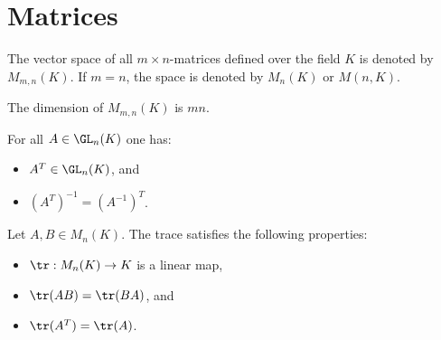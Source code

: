 \section{Matrices}

    \begin{notation}\label{linalgebra:matrix_set}
        The vector space of all $m\times n$-matrices defined over the field $K$ is denoted by $M_{m,n}(K)$. If $m=n$, the space is denoted by $M_n(K)$ or $M(n,K)$.
    \end{notation}

    \begin{property}[Dimension]\label{linalgebra:dimension_of_matrix_space}
        The dimension of $M_{m,n}(K)$ is $mn$.
    \end{property}

    \begin{property}
        For all $A\in\GL_n(K)$ one has:
        \begin{itemize}
            \item $A^T\in\GL_n(K)$, and
            \item $\left(A^T\right)^{-1}=\left(A^{-1}\right)^T$.
        \end{itemize}
    \end{property}

    \begin{property}\label{linalgebra:trace_commutative}
        Let $A,B\in M_n(K)$. The trace satisfies the following properties:
        \begin{itemize}
            \item $\tr:M_n(K)\rightarrow K$ is a linear map,
            \item $\tr(AB) = \tr(BA)$, and
            \item $\tr(A^T) = \tr(A)$.
        \end{itemize}
    \end{property}

